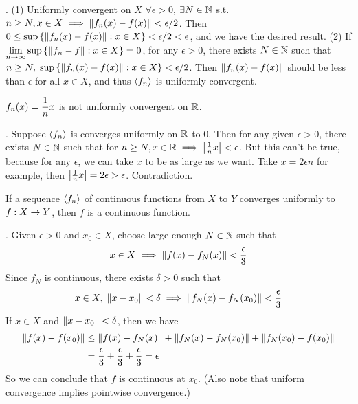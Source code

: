 \pf. (1) Uniformly convergent on \(X\) \mimp \(\forall \epsilon > 0\), \(\exists N \in \mathbb{N}\) s.t. \(n \geq N, x\in X \implies \left\lVert f_n(x) - f(x)\right\rVert < \epsilon/2\). Then \(0 \leq \sup\left\{\left\lVert f_n(x) - f(x)\right\rVert : x \in X \right\} < \epsilon/2 < \epsilon\), and we have the desired result.
(2) If \(\displaystyle \lim_{n\rightarrow \infty} \sup \left\{\left\lVert f_n-f\right\rVert: x\in X\right\} = 0\), for any \(\epsilon > 0\), there exists \(N\in \mathbb{N}\) such that \(n\geq N,\; \sup\left\{\left\lVert f_n(x) - f(x)\right\rVert : x \in X \right\} < \epsilon / 2\). Then \(\left\lVert f_n(x) - f(x)\right\rVert\) should be less than \(\epsilon\) for all \(x\in X\), and thus \(\left\langle f_n \right\rangle\) is uniformly convergent.

 \(\displaystyle f_n(x) = \frac{1}{n}x\) is not uniformly convergent on \(\mathbb{R}\).

\pf. Suppose \(\left\langle f_n \right\rangle\) is converges uniformly on \(\mathbb{R}\) to 0. Then for any given \(\epsilon > 0\), there exists \(N\in\mathbb{N}\) such that for \(n\geq N, x\in \mathbb{R} \implies \left|\frac{1}{n}x\right| < \epsilon\). But this can't be true, because for any \(\epsilon\), we can take \(x\) to be as large as we want. Take \(x = 2\epsilon n\) for example, then \(\left|\frac{1}{n}x\right| = 2\epsilon > \epsilon\). Contradiction.

 If a sequence \(\left\langle f_n \right\rangle\) of continuous functions from \(X\) to \(Y\) converges uniformly to \(f: X \rightarrow Y\), then \(f\) is a continuous function.

\pf. Given \(\epsilon > 0\) and \(x_0 \in X\), choose large enough \(N\in\mathbb{N}\) such that
\[
	x \in X \implies \left\lVert f(x) - f_N(x)\right\rVert < \frac{\epsilon}{3}
\]
Since \(f_N\) is continuous, there exists \(\delta > 0\) such that
\[
	x\in X,\; \left\lVert x - x_0\right\rVert < \delta \implies \left\lVert f_N(x) - f_N(x_0)\right\rVert < \frac{\epsilon}{3}
\]
If \(x\in X\) and \(\left\lVert x - x_0\right\rVert < \delta\), then we have
\[
	\begin{aligned}
		\left\lVert f(x) - f(x_0)\right\rVert & \leq \left\lVert f(x) - f_N(x)\right\rVert + \left\lVert f_N(x) - f_N(x_0)\right\rVert + \left\lVert f_N(x_0) -f(x_0)\right\rVert \\
		                     & = \frac{\epsilon}{3} + \frac{\epsilon}{3} + \frac{\epsilon}{3} = \epsilon
	\end{aligned}
\]
So we can conclude that \(f\) is continuous at \(x_0\). (Also note that uniform convergence implies pointwise convergence.)

